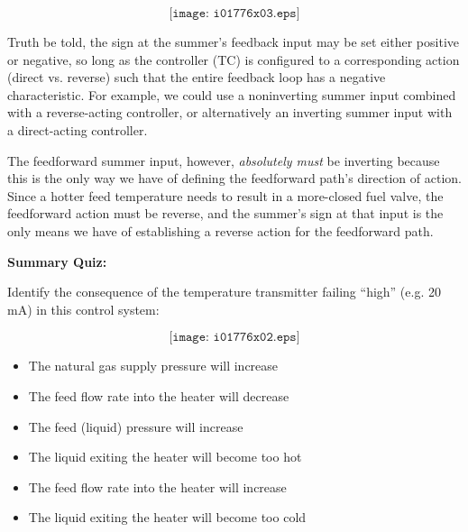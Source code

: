 $$\texttt{[image: i01776x03.eps]}$$

Truth be told, the sign at the summer's feedback input may be set either positive or negative, so long as the controller (TC) is configured to a corresponding action (direct vs. reverse) such that the entire feedback loop has a negative characteristic.  For example, we could use a noninverting summer input combined with a reverse-acting controller, or alternatively an inverting summer input with a direct-acting controller.

The feedforward summer input, however, {\it absolutely must} be inverting because this is the only way we have of defining the feedforward path's direction of action.  Since a hotter feed temperature needs to result in a more-closed fuel valve, the feedforward action must be reverse, and the summer's sign at that input is the only means we have of establishing a reverse action for the feedforward path.



\vfil \eject

\noindent
{\bf Summary Quiz:}

Identify the consequence of the temperature transmitter failing ``high'' (e.g. 20 mA) in this control system:

$$\texttt{[image: i01776x02.eps]}$$

\begin{itemize}
\item{} The natural gas supply pressure will increase
\vskip 5pt 
\item{} The feed flow rate into the heater will decrease
\vskip 5pt 
\item{} The feed (liquid) pressure will increase
\vskip 5pt 
\item{} The liquid exiting the heater will become too hot 
\vskip 5pt 
\item{} The feed flow rate into the heater will increase 
\vskip 5pt 
\item{} The liquid exiting the heater will become too cold
\end{itemize}




